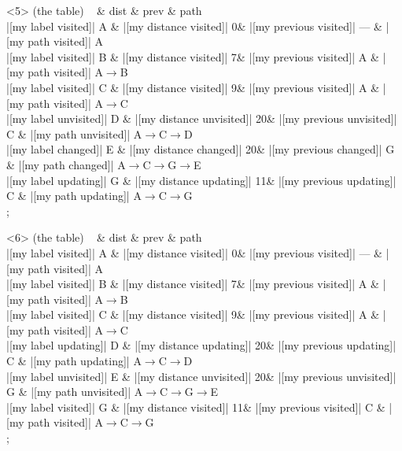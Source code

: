 \begin{onlyenv}<5>
 (the table) {
~ \& dist \& prev \& path \\
|[my label visited]| A \& |[my distance visited]| 0\& |[my previous visited]| --- \& |[my path visited]| A\\
|[my label visited]| B \& |[my distance visited]| 7\& |[my previous visited]| A \& |[my path visited]| A$\rightarrow$B\\
|[my label visited]| C \& |[my distance visited]| 9\& |[my previous visited]| A \& |[my path visited]| A$\rightarrow$C\\
|[my label unvisited]| D \& |[my distance unvisited]| 20\& |[my previous unvisited]| C \& |[my path unvisited]| A$\rightarrow$C$\rightarrow$D\\
|[my label changed]| E \& |[my distance changed]| 20\& |[my previous changed]| G \& |[my path changed]| A$\rightarrow$C$\rightarrow$G$\rightarrow$E\\
|[my label updating]| G \& |[my distance updating]| 11\& |[my previous updating]| C \& |[my path updating]| A$\rightarrow$C$\rightarrow$G\\
};
\end{onlyenv}
            
\begin{onlyenv}<6>
 (the table) {
~ \& dist \& prev \& path \\
|[my label visited]| A \& |[my distance visited]| 0\& |[my previous visited]| --- \& |[my path visited]| A\\
|[my label visited]| B \& |[my distance visited]| 7\& |[my previous visited]| A \& |[my path visited]| A$\rightarrow$B\\
|[my label visited]| C \& |[my distance visited]| 9\& |[my previous visited]| A \& |[my path visited]| A$\rightarrow$C\\
|[my label updating]| D \& |[my distance updating]| 20\& |[my previous updating]| C \& |[my path updating]| A$\rightarrow$C$\rightarrow$D\\
|[my label unvisited]| E \& |[my distance unvisited]| 20\& |[my previous unvisited]| G \& |[my path unvisited]| A$\rightarrow$C$\rightarrow$G$\rightarrow$E\\
|[my label visited]| G \& |[my distance visited]| 11\& |[my previous visited]| C \& |[my path visited]| A$\rightarrow$C$\rightarrow$G\\
};
\end{onlyenv}
            
